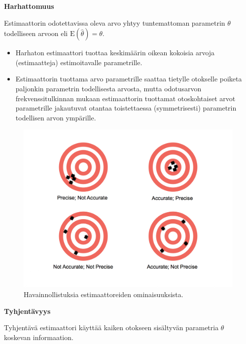 \documentclass[
]{book}
\providecommand{\tightlist}{%
  \setlength{\itemsep}{0pt}\setlength{\parskip}{0pt}}
\begin{document}
\begin{defblock}{}

\textbf{Harhattomuus}

Estimaattorin odotettavissa oleva arvo yhtyy tuntemattoman parametrin \(\theta\) todelliseen arvoon eli \(\text{E}(\widehat{\theta}) = \theta\).

\begin{itemize}
\tightlist
\item
  Harhaton estimaattori tuottaa keskimäärin oikean kokoisia arvoja (estimaatteja) estimoitavalle parametrille.
\item
  Estimaattorin tuottama arvo parametrille saattaa tietylle otokselle poiketa paljonkin parametrin todellisesta arvosta, mutta odotusarvon frekvenssitulkinnan mukaan estimaattorin tuottamat otoskohtaiset arvot parametrille jakautuvat otantaa toistettaessa (symmetrisesti) parametrin todellisen arvon ympärille.
\end{itemize}

\end{defblock}

\begin{figure}

{\centering \includegraphics[width=1\linewidth]{images/unbiased} 

}

\caption{Havainnollistuksia estimaattoreiden ominaisuuksista.}\label{fig:unbiased}
\end{figure}

\begin{defblock}{}
\textbf{Tyhjentävyys}

Tyhjentävä estimaattori käyttää kaiken otokseen sisältyvän parametria \(\theta\) koskevan informaation.

\end{defblock}
\end{document}
